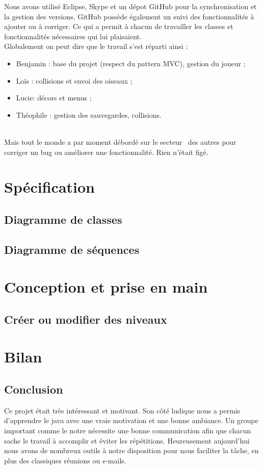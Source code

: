 \documentclass[a4paper,12pt]{report}
\begin{document}
Nous avons utilisé Eclipse, Skype et un dépot GitHub pour la synchronisation et la gestion des versions.
GitHub possède également un suivi des fonctionnalités à ajouter ou à corriger. Ce qui a 
permit à chacun de travailler les classes et fonctionnalités nécessaires qui lui plaisaient.\\

Globalement on peut dire que le travail s'est réparti ainsi :
\begin{itemize}
 \item Benjamin  : base du projet (respect du pattern MVC), gestion du joueur ;
 \item Loïs : collisions et envoi des oiseaux ;
 \item Lucie: décors et menus ;
 \item Théophile : gestion des sauvegardes, collisions.
\end{itemize}
~\\
Mais tout le monde a par moment débordé sur le \guillemotleft secteur\guillemotright~ 
des autres pour corriger un bug ou améliorer une fonctionnalité. Rien n'était figé.

\chapter{Spécification}
\section{Diagramme de classes}
\section{Diagramme de séquences}

\chapter{Conception et prise en main}
\section{Créer ou modifier des niveaux}

\chapter{Bilan}
\section{Conclusion}
Ce projet était très intéressant et motivant. Son côté ludique nous a permis
d'apprendre le java avec une vraie motivation et une bonne ambiance. Un groupe 
important comme le notre nécessite une bonne communication afin que chacun sache 
le travail à accomplir et éviter les répétitions. Heureusement aujourd'hui nous avons de nombreux outils 
à notre disposition pour nous faciliter la tâche, en plus des classiques réunions ou e-mails.
\end{document}
